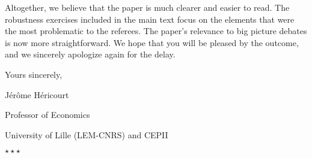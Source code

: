 \documentclass[12pt]{article}
\newcommand*\sepstars{%
  \begin{center}
    $\star\star\star$
  \end{center}}
\begin{document}
Altogether, we believe that the paper is much clearer and easier to read. The robustness exercises included in the main text focus on the elements that were the most problematic to the referees. The paper's relevance to big picture debates is now more straightforward. We hope that you will be pleased by the outcome, and we sincerely apologize again for the delay.

\bigskip

Yours sincerely,

\bigskip

\hfill Jérôme Héricourt

\hfill Professor of Economics

\hfill University of Lille (LEM-CNRS) and CEPII

\bigskip
\bigskip
\bigskip
\sepstars
\end{document}
